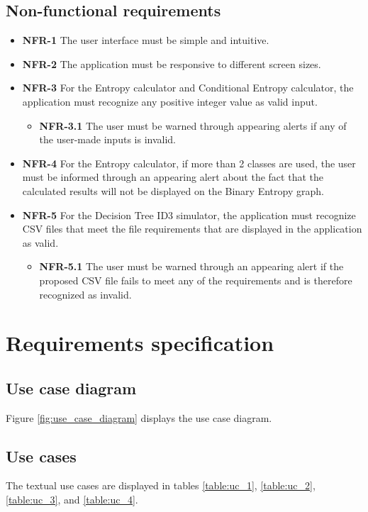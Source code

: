 \subsection{Non-functional requirements}
\begin{itemize}
    \item \textbf{NFR-1} The user interface must be simple and intuitive.
    \item \textbf{NFR-2} The application must be responsive to different screen sizes.
    \item \textbf{NFR-3} For the Entropy calculator and Conditional Entropy calculator, the application must recognize any positive integer value as valid input.
    \begin{itemize}
        \item \textbf{NFR-3.1} The user must be warned through appearing alerts if any of the user-made inputs is invalid.
    \end{itemize}
    \item \textbf{NFR-4} For the Entropy calculator, if more than 2 classes are used, the user must be informed through an appearing alert about the fact that the calculated results will not be displayed on the Binary Entropy graph.
    \item \textbf{NFR-5} For the Decision Tree ID3 simulator, the application must recognize CSV files that meet the file requirements that are displayed in the application as valid.
    \begin{itemize}
        \item \textbf{NFR-5.1} The user must be warned through an appearing alert if the proposed CSV file fails to meet any of the requirements and is therefore recognized as invalid.
    \end{itemize}
\end{itemize}

\section{Requirements specification}
\subsection{Use case diagram}
Figure \ref{fig:use_case_diagram} displays the use case diagram.

\subsection{Use cases}
The textual use cases are displayed in tables \ref{table:uc_1}, \ref{table:uc_2}, \ref{table:uc_3}, and \ref{table:uc_4}.

